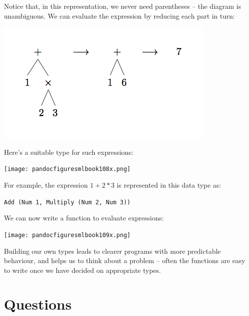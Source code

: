 \documentclass[]{book}
\newcommand{\smspace}{\vspace{4mm}}
\begin{document}
\noindent Notice that, in this representation, we never need parentheses -- the diagram is unambiguous. We can evaluate the expression by reducing each part in turn:

\smspace
\includegraphics{kindlefig2.png}
\smspace

\noindent Here's a suitable type for such expressions:

\medskip
\begin{center}
\noindent\texttt{[image: pandocfiguresmlbook108x.png]}
\end{center}
\medskip

\noindent For example, the expression $1 + 2 * 3$ is represented in this data type as:

\smspace
\texttt{Add (Num 1, Multiply (Num 2, Num 3))}
\smspace

\noindent We can now write a function to evaluate expressions:

\medskip
\begin{center}
\noindent\texttt{[image: pandocfiguresmlbook109x.png]}
\end{center}
\medskip

\noindent Building our own types leads to clearer programs with more predictable behaviour, and helps us to think about a problem -- often the functions are easy to write once we have decided on appropriate types.

\clearpage
\section*{Questions}
\end{document}
